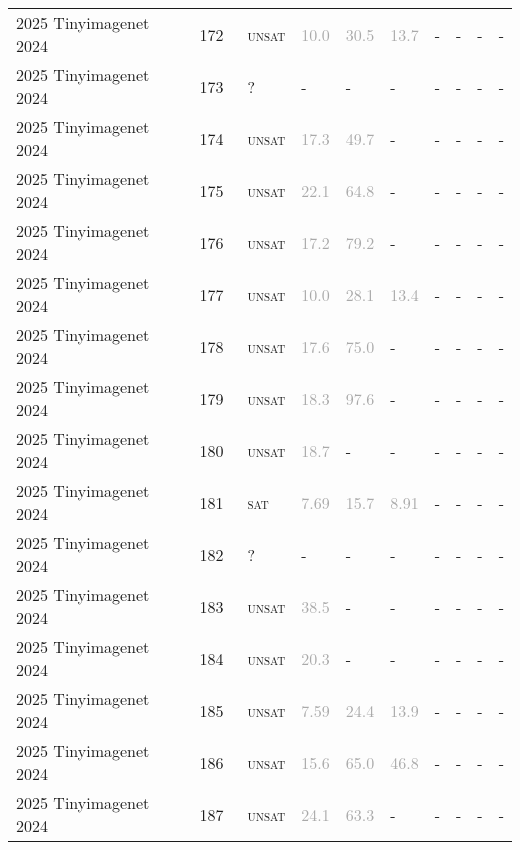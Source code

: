 \begin{center}
{\begin{longtable}{@{}llllllllll@{}}
2025 Tinyimagenet 2024 & 172 & ~\textsc{unsat} & \textcolor{darkgray}{10.0} & \textcolor{darkgray}{30.5} & \textcolor{darkgray}{13.7} & - & - & - & - \\
2025 Tinyimagenet 2024 & 173 & ~? & - & - & - & - & - & - & - \\
2025 Tinyimagenet 2024 & 174 & ~\textsc{unsat} & \textcolor{darkgray}{17.3} & \textcolor{darkgray}{49.7} & - & - & - & - & - \\
2025 Tinyimagenet 2024 & 175 & ~\textsc{unsat} & \textcolor{darkgray}{22.1} & \textcolor{darkgray}{64.8} & - & - & - & - & - \\
2025 Tinyimagenet 2024 & 176 & ~\textsc{unsat} & \textcolor{darkgray}{17.2} & \textcolor{darkgray}{79.2} & - & - & - & - & - \\
2025 Tinyimagenet 2024 & 177 & ~\textsc{unsat} & \textcolor{darkgray}{10.0} & \textcolor{darkgray}{28.1} & \textcolor{darkgray}{13.4} & - & - & - & - \\
2025 Tinyimagenet 2024 & 178 & ~\textsc{unsat} & \textcolor{darkgray}{17.6} & \textcolor{darkgray}{75.0} & - & - & - & - & - \\
2025 Tinyimagenet 2024 & 179 & ~\textsc{unsat} & \textcolor{darkgray}{18.3} & \textcolor{darkgray}{97.6} & - & - & - & - & - \\
2025 Tinyimagenet 2024 & 180 & ~\textsc{unsat} & \textcolor{darkgray}{18.7} & - & - & - & - & - & - \\
2025 Tinyimagenet 2024 & 181 & ~\textsc{sat} & \textcolor{darkgray}{7.69} & \textcolor{darkgray}{15.7} & \textcolor{darkgray}{8.91} & - & - & - & - \\
2025 Tinyimagenet 2024 & 182 & ~? & - & - & - & - & - & - & - \\
2025 Tinyimagenet 2024 & 183 & ~\textsc{unsat} & \textcolor{darkgray}{38.5} & - & - & - & - & - & - \\
2025 Tinyimagenet 2024 & 184 & ~\textsc{unsat} & \textcolor{darkgray}{20.3} & - & - & - & - & - & - \\
2025 Tinyimagenet 2024 & 185 & ~\textsc{unsat} & \textcolor{darkgray}{7.59} & \textcolor{darkgray}{24.4} & \textcolor{darkgray}{13.9} & - & - & - & - \\
2025 Tinyimagenet 2024 & 186 & ~\textsc{unsat} & \textcolor{darkgray}{15.6} & \textcolor{darkgray}{65.0} & \textcolor{darkgray}{46.8} & - & - & - & - \\
2025 Tinyimagenet 2024 & 187 & ~\textsc{unsat} & \textcolor{darkgray}{24.1} & \textcolor{darkgray}{63.3} & - & - & - & - & - \\

\end{longtable}}
\end{center}
